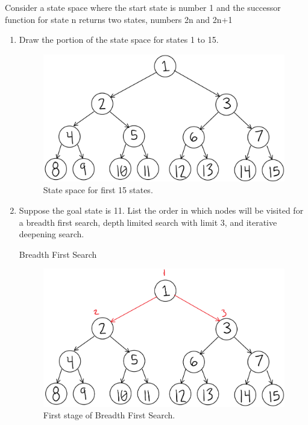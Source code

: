 \documentclass[11pt]{article}
\newenvironment{problem}[2][Problem]{\begin{trivlist}
\item[\hskip \labelsep {\bfseries #1}\hskip \labelsep {\bfseries #2.}]}{\end{trivlist}}
\begin{document}
\begin{problem}{10}
	Consider a state space where the start state is number 1 and the successor function for state n returns two states, numbers 2n and 2n+1
	\begin{enumerate}
		\item Draw the portion of the state space for states 1 to 15.
			\begin{figure}
				\includegraphics[scale=0.4]{TreeMain.PNG}
				\caption{State space for first 15 states.}
				\label{bfs.fig}
			\end{figure}					
		\item Suppose the goal state is 11. List the order in which nodes will be visited for a breadth first search, depth limited search with limit 3, and iterative deepening search.
			\newline
			\begin{large}Breadth First Search\end{large}
			\begin{figure}
				\includegraphics[scale=0.4]{BFS_1.png}
				\caption{First stage of Breadth First Search.}
				\label{fig.bfs}
			\end{figure}

\end{enumerate}
\end{problem}
\end{document}
